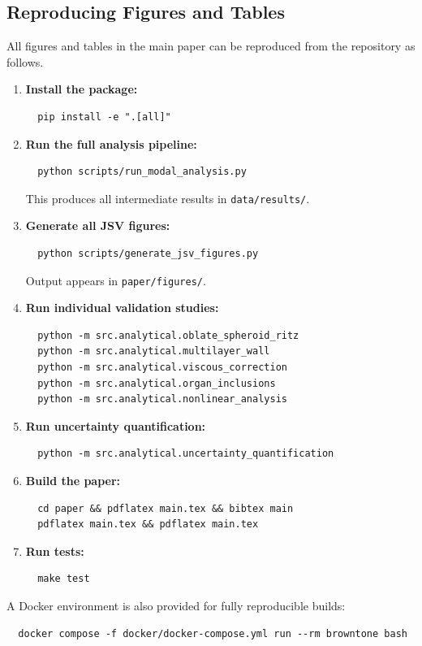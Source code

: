 \documentclass[12pt]{article}
\begin{document}
\subsection{Reproducing Figures and Tables}
\label{sec:reproduce}

All figures and tables in the main paper can be reproduced from the repository
as follows.

\begin{enumerate}[nosep]
  \item \textbf{Install the package:}
\begin{verbatim}
  pip install -e ".[all]"
\end{verbatim}

  \item \textbf{Run the full analysis pipeline:}
\begin{verbatim}
  python scripts/run_modal_analysis.py
\end{verbatim}
    This produces all intermediate results in \texttt{data/results/}.

  \item \textbf{Generate all JSV figures:}
\begin{verbatim}
  python scripts/generate_jsv_figures.py
\end{verbatim}
    Output appears in \texttt{paper/figures/}.

  \item \textbf{Run individual validation studies:}
\begin{verbatim}
  python -m src.analytical.oblate_spheroid_ritz
  python -m src.analytical.multilayer_wall
  python -m src.analytical.viscous_correction
  python -m src.analytical.organ_inclusions
  python -m src.analytical.nonlinear_analysis
\end{verbatim}

  \item \textbf{Run uncertainty quantification:}
\begin{verbatim}
  python -m src.analytical.uncertainty_quantification
\end{verbatim}

  \item \textbf{Build the paper:}
\begin{verbatim}
  cd paper && pdflatex main.tex && bibtex main
  pdflatex main.tex && pdflatex main.tex
\end{verbatim}

  \item \textbf{Run tests:}
\begin{verbatim}
  make test
\end{verbatim}
\end{enumerate}

\noindent
A Docker environment is also provided for fully reproducible builds:
\begin{verbatim}
  docker compose -f docker/docker-compose.yml run --rm browntone bash
\end{verbatim}
\end{document}
